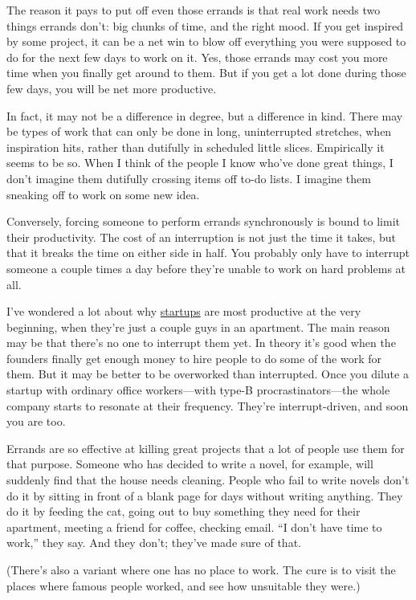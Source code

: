 The reason it pays to put off even those errands is that real work needs
two things errands don't: big chunks of time, and the right mood. If you
get inspired by some project, it can be a net win to blow off everything
you were supposed to do for the next few days to work on it. Yes, those
errands may cost you more time when you finally get around to them. But
if you get a lot done during those few days, you will be net more
productive.

In fact, it may not be a difference in degree, but a difference in kind.
There may be types of work that can only be done in long, uninterrupted
stretches, when inspiration hits, rather than dutifully in scheduled
little slices. Empirically it seems to be so. When I think of the people
I know who've done great things, I don't imagine them dutifully crossing
items off to-do lists. I imagine them sneaking off to work on some new
idea.

Conversely, forcing someone to perform errands synchronously is bound to
limit their productivity. The cost of an interruption is not just the
time it takes, but that it breaks the time on either side in half. You
probably only have to interrupt someone a couple times a day before
they're unable to work on hard problems at all.

I've wondered a lot about why \href{start.html}{startups} are most
productive at the very beginning, when they're just a couple guys in an
apartment. The main reason may be that there's no one to interrupt them
yet. In theory it's good when the founders finally get enough money to
hire people to do some of the work for them. But it may be better to be
overworked than interrupted. Once you dilute a startup with ordinary
office workers---with type-B procrastinators---the whole company starts
to resonate at their frequency. They're interrupt-driven, and soon you
are too.

Errands are so effective at killing great projects that a lot of people
use them for that purpose. Someone who has decided to write a novel, for
example, will suddenly find that the house needs cleaning. People who
fail to write novels don't do it by sitting in front of a blank page for
days without writing anything. They do it by feeding the cat, going out
to buy something they need for their apartment, meeting a friend for
coffee, checking email. ``I don't have time to work,'' they say. And
they don't; they've made sure of that.

(There's also a variant where one has no place to work. The cure is to
visit the places where famous people worked, and see how unsuitable they
were.)

